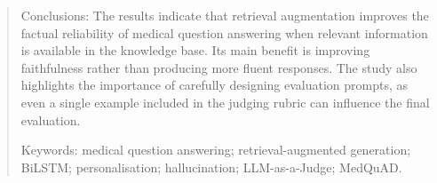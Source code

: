 \begin{abstract}
Conclusions: The results indicate that retrieval augmentation improves the factual reliability of medical question answering when relevant information is available in the knowledge base. Its main benefit is improving faithfulness rather than producing more fluent responses. The study also highlights the importance of carefully designing evaluation prompts, as even a single example included in the judging rubric can influence the final evaluation.

Keywords: medical question answering; retrieval-augmented generation; BiLSTM; personalisation; hallucination; LLM-as-a-Judge; MedQuAD.

\end{abstract}

